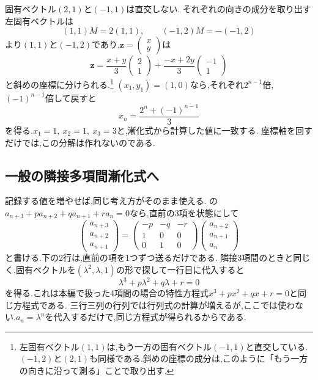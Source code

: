 固有ベクトル$(2,1)$と$(-1,1)$は直交しない.
それぞれの向きの成分を取り出す左固有ベクトルは
\[
  (1,1)M=2(1,1),\qquad (-1,2)M=-(-1,2)
\]
より$(1,1)$と$(-1,2)$であり,$\boldsymbol z=\begin{pmatrix}x\\y\end{pmatrix}$は
\[
  \boldsymbol z=\frac{x+y}{3}\begin{pmatrix}2\\1\end{pmatrix}+\frac{-x+2y}{3}\begin{pmatrix}-1\\1\end{pmatrix}
\]
と斜めの座標に分けられる.\footnote{左固有ベクトル$(1,1)$は,もう一方の固有ベクトル$(-1,1)$と直交している.$(-1,2)$と$(2,1)$も同様である.斜めの座標の成分は,このように「もう一方の向きに沿って測る」ことで取り出す.}
$(x_1,y_1)=(1,0)$なら,それぞれ$2^{n-1}$倍,$(-1)^{n-1}$倍して戻すと
\[
  x_n=\frac{2^n+(-1)^{n-1}}{3}
\]
を得る.$x_1=1,\ x_2=1,\ x_3=3$と,漸化式から計算した値に一致する.
座標軸を回すだけでは,この分解は作れないのである.




\subsection{一般の隣接多項間漸化式へ}\label{節：一般の隣接多項間漸化式へ}
記録する値を増やせば,同じ考え方がそのまま使える.
の$a_{n+3}+pa_{n+2}+qa_{n+1}+ra_n=0$なら,直前の3項を状態にして
\[
  \begin{pmatrix}a_{n+3}\\a_{n+2}\\a_{n+1}\end{pmatrix}
  =\begin{pmatrix}-p&-q&-r\\1&0&0\\0&1&0\end{pmatrix}
  \begin{pmatrix}a_{n+2}\\a_{n+1}\\a_n\end{pmatrix}
\]
と書ける.下の2行は,直前の項を1つずつ送るだけである.
隣接3項間のときと同じく,固有ベクトルを$(\lambda^2,\lambda,1)$の形で探して一行目に代入すると
\[
  \lambda^3+p\lambda^2+q\lambda+r=0
\]
を得る.これは本編で扱った4項間の場合の特性方程式$x^3+px^2+qx+r=0$と同じ方程式である.
三行三列の行列では行列式の計算が増えるが,ここでは使わない.$a_n=\lambda^n$を代入するだけで,同じ方程式が得られるからである.


